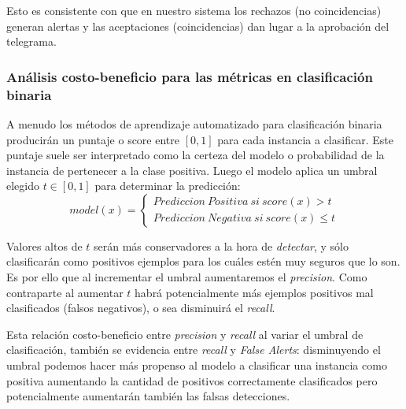 \noindent Esto es consistente con que en nuestro sistema los rechazos (no coincidencias) generan alertas y las aceptaciones (coincidencias) dan lugar a la aprobación del telegrama.

\subsubsection{Análisis costo-beneficio para las métricas en clasificación binaria}
\label{subsubsection:costo-beneficio}

A menudo los métodos de aprendizaje automatizado para clasificación binaria producirán un puntaje o score entre $[ 0 , 1 ]$ para cada instancia a clasificar. Este puntaje suele ser interpretado como la certeza del modelo o probabilidad de la instancia de pertenecer a la clase positiva.
Luego el modelo aplica un umbral elegido $t \in [0,1]$ para determinar la predicción:
\begin{equation*}
    model(x) = \left\lbrace\begin{array}{c} Prediccion~Positiva~si~score(x) > t \\  Prediccion~Negativa~si~score(x) \leq t \end{array}\right.
\end{equation*}

Valores altos de $t$ serán más conservadores a la hora de \textit{detectar}, y sólo clasificarán como positivos ejemplos para los cuáles estén muy seguros que lo son. Es por ello que al incrementar el umbral aumentaremos el \textit{precision}. Como contraparte al aumentar $t$ habrá potencialmente más ejemplos positivos mal clasificados (falsos negativos), o sea disminuirá el \textit{recall}.

Esta relación costo-beneficio entre \textit{precision} y \textit{recall} al variar el umbral de clasificación, también se evidencia entre \textit{recall} y \textit{False Alerts}: disminuyendo el umbral podemos hacer más propenso al modelo a clasificar una instancia como positiva aumentando la cantidad de positivos correctamente clasificados pero potencialmente aumentarán también las falsas detecciones.

